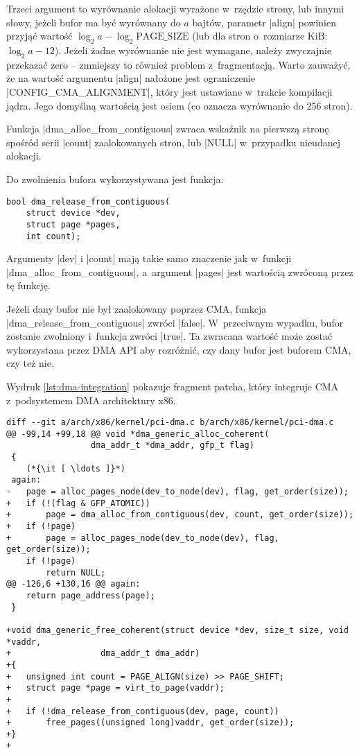 Trzeci argument to wyrównanie alokacji wyrażone w~rzędzie strony, lub
innymi słowy, jeżeli bufor ma być wyrównany do $a$ bajtów, parametr
\code|align| powinien przyjąć wartość $\log_2 a - \log_2
\mathrm{PAGE\_SIZE}$ (lub dla stron o~rozmiarze \unit[4096]{KiB}:
$\log_2 a - 12$).  Jeżeli żadne wyrównanie nie jest wymagane, należy
zwyczajnie przekazać zero -- zmniejszy to również problem
z~fragmentacją.  Warto zauważyć, że na wartość argumentu
\code|align| nałożone jest ograniczenie
\code|CONFIG_CMA_ALIGNMENT|, który jest ustawiane w~trakcie
kompilacji jądra.  Jego domyślną wartością jest osiem (co oznacza
wyrównanie do 256 stron).

Funkcja \code|dma_alloc_from_contiguous| zwraca wskaźnik na
pierwszą stronę spośród serii \code|count| zaalokowanych stron,
lub \code|NULL| w~przypadku nieudanej alokacji.

Do zwolnienia bufora wykorzystywana jest funkcja:

\begin{lstlisting}
bool dma_release_from_contiguous(
	struct device *dev,
	struct page *pages,
	int count);
\end{lstlisting}

Argumenty \code|dev| i \code|count| mają takie samo
znaczenie jak w~funkcji \code|dma_alloc_from_contiguous|,
a~argument \code|pages| jest wartością zwróconą przez tę funkcję.

Jeżeli dany bufor nie był zaalokowany poprzez CMA, funkcja
\code|dma_release_from_contiguous| zwróci \code|false|.
W~przeciwnym wypadku, bufor zostanie zwolniony i~funkcja zwróci
\code|true|.  Ta zwracana wartość może zostać wykorzystana przez
DMA API aby rozróżnić, czy dany bufor jest buforem CMA, czy też nie.

Wydruk \ref{lst:dma-integration} pokazuje fragment patcha, który
integruje CMA z~podsystemem DMA architektury x86.

\begin{lstlisting}[float=tbhp,caption={Integracja CMA z~podsystemem DMA
      architektury x86.},label=lst:dma-integration]
diff --git a/arch/x86/kernel/pci-dma.c b/arch/x86/kernel/pci-dma.c
@@ -99,14 +99,18 @@ void *dma_generic_alloc_coherent(
 				 dma_addr_t *dma_addr, gfp_t flag)
 {
	(*{\it [ \ldots ]}*)
 again:
-	page = alloc_pages_node(dev_to_node(dev), flag, get_order(size));
+	if (!(flag & GFP_ATOMIC))
+		page = dma_alloc_from_contiguous(dev, count, get_order(size));
+	if (!page)
+		page = alloc_pages_node(dev_to_node(dev), flag, get_order(size));
 	if (!page)
 		return NULL;
@@ -126,6 +130,16 @@ again:
 	return page_address(page);
 }

+void dma_generic_free_coherent(struct device *dev, size_t size, void *vaddr,
+			       dma_addr_t dma_addr)
+{
+	unsigned int count = PAGE_ALIGN(size) >> PAGE_SHIFT;
+	struct page *page = virt_to_page(vaddr);
+
+	if (!dma_release_from_contiguous(dev, page, count))
+		free_pages((unsigned long)vaddr, get_order(size));
+}
+
\end{lstlisting}

